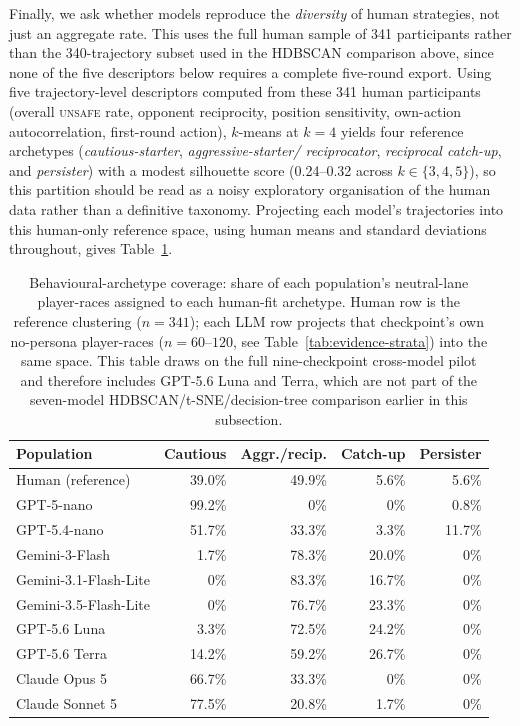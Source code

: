 \documentclass[sigconf]{aamas}
\newcommand{\Unsafe}{\textsc{unsafe}}
\begin{document}
Finally, we ask whether models reproduce the \emph{diversity} of human
strategies, not just an aggregate rate. This uses the full human sample of
341 participants rather than the 340-trajectory subset used in the
HDBSCAN comparison above, since none of the five
descriptors below requires a complete five-round export. Using five
trajectory-level descriptors computed from these 341 human participants
(overall \Unsafe{} rate, opponent reciprocity, position sensitivity,
own-action autocorrelation, first-round action), $k$-means at $k=4$ yields
four
reference archetypes (\emph{cautious-starter}, \emph{aggressive-starter/%
reciprocator}, \emph{reciprocal catch-up}, and \emph{persister}) with a
modest silhouette score (0.24--0.32 across $k\in\{3,4,5\}$), so this
partition should be read as a noisy exploratory organisation of the human
data rather than a definitive taxonomy. Projecting each model's
trajectories into this human-only reference space, using human means and
standard deviations throughout, gives
Table~\ref{tab:archetype-coverage}.

\begin{table}[t]
  \caption{Behavioural-archetype coverage: share of each population's
  neutral-lane player-races assigned to each human-fit archetype.
  Human row is the reference clustering ($n{=}341$); each LLM row
  projects that checkpoint's own no-persona player-races
  ($n{=}60$--$120$, see Table~\ref{tab:evidence-strata}) into the same
  space. This table draws on the full nine-checkpoint cross-model pilot
  and therefore includes GPT-5.6 Luna and Terra, which are not part of
  the seven-model HDBSCAN/t-SNE/decision-tree comparison earlier in
  this subsection.}
  \label{tab:archetype-coverage}
  \centering
  \footnotesize
  \setlength{\tabcolsep}{3pt}
  \begin{tabular}{@{}lrrrr@{}}
    \toprule
    Population & Cautious & Aggr./recip. & Catch-up & Persister \\
    \midrule
    Human (reference)      & 39.0\% & 49.9\% & 5.6\%  & 5.6\% \\
    GPT-5-nano              & 99.2\% & 0\%    & 0\%    & 0.8\% \\
    GPT-5.4-nano            & 51.7\% & 33.3\% & 3.3\%  & 11.7\% \\
    Gemini-3-Flash          & 1.7\%  & 78.3\% & 20.0\% & 0\% \\
    Gemini-3.1-Flash-Lite   & 0\%    & 83.3\% & 16.7\% & 0\% \\
    Gemini-3.5-Flash-Lite   & 0\%    & 76.7\% & 23.3\% & 0\% \\
    GPT-5.6 Luna            & 3.3\%  & 72.5\% & 24.2\% & 0\% \\
    GPT-5.6 Terra           & 14.2\% & 59.2\% & 26.7\% & 0\% \\
    Claude Opus 5           & 66.7\% & 33.3\% & 0\%    & 0\% \\
    Claude Sonnet 5         & 77.5\% & 20.8\% & 1.7\%  & 0\% \\
    \bottomrule
  \end{tabular}
\end{table}
\end{document}
